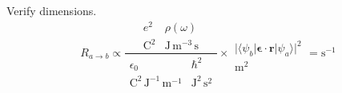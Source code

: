 Verify dimensions.
\begin{equation*}
R_{a\rightarrow b}\propto
\frac{\begin{matrix}
e^2 & \rho(\omega)
\\
\text{C}^2 & \text{J}\,\text{m}^{-3}\,\text{s}
\end{matrix}}
{\begin{matrix}
\epsilon_0 & \hbar^2
\\
\text{C}^2\,\text{J}^{-1}\,\text{m}^{-1} & \text{J}^2\,\text{s}^2
\end{matrix}}
\times
\begin{matrix}
\\
\bigl|\langle\psi_b|\boldsymbol{\epsilon}\cdot\mathbf r|\psi_a\rangle\bigr|^2
\\
\text{m}^2
\end{matrix}
=\text{s}^{-1}
\end{equation*}


